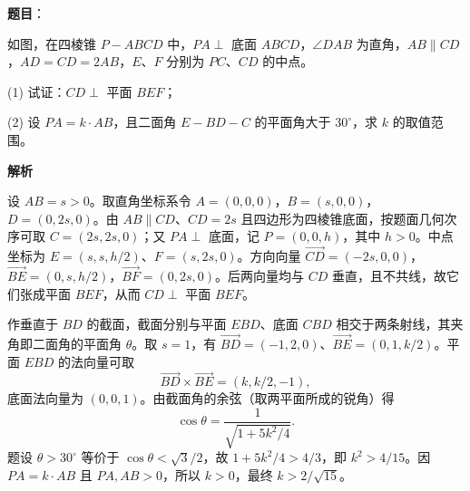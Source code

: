 \begin{answer}

\textbf{题目}：

如图，在四棱锥 \(P-ABCD\) 中，\(PA\perp\) 底面 \(ABCD\)，\(\angle DAB\) 为直角，\(AB\parallel CD\)，\(AD=CD=2AB\)，$E\text{、}F$ 分别为 $PC\text{、}CD$ 的中点。
\nopagebreak[4]
\begin{center}\end{center}
\nopagebreak[4]
(1) 试证：\(CD\perp\) 平面 \(BEF\)；

(2) 设 \(PA=k\cdot AB\)，且二面角 \(E-BD-C\) 的平面角大于 \(30^\circ\)，求 \(k\) 的取值范围。

\textbf{解析}


设 \(AB=s>0\)。取直角坐标系令 \(A=(0,0,0)\)，\(B=(s,0,0)\)，\(D=(0,2s,0)\)。由 \(AB\parallel CD\)、\(CD=2s\) 且四边形为四棱锥底面，按题面几何次序可取 \(C=(2s,2s,0)\)；又 \(PA\perp\) 底面，记 \(P=(0,0,h)\)，其中 \(h>0\)。中点坐标为 \(E=(s,s,h/2)\)、\(F=(s,2s,0)\)。方向向量 \(\overrightarrow{CD}=(-2s,0,0)\)，\(\overrightarrow{BE}=(0,s,h/2)\)，\(\overrightarrow{BF}=(0,2s,0)\)。后两向量均与 \(CD\) 垂直，且不共线，故它们张成平面 \(BEF\)，从而 \(CD\perp\) 平面 \(BEF\)。


作垂直于 \(BD\) 的截面，截面分别与平面 \(EBD\)、底面 \(CBD\) 相交于两条射线，其夹角即二面角的平面角 \(\theta\)。取 \(s=1\)，有 \(\overrightarrow{BD}=(-1,2,0)\)、\(\overrightarrow{BE}=(0,1,k/2)\)。平面 \(EBD\) 的法向量可取
\nopagebreak[4]
\[
\overrightarrow{BD}\times\overrightarrow{BE}=(k,k/2,-1),
\]
底面法向量为 \((0,0,1)\)。由截面角的余弦（取两平面所成的锐角）得
\nopagebreak[4]
\[
\cos\theta=\frac1{\sqrt{1+5k^2/4}}.
\]
题设 \(\theta>30^\circ\) 等价于 \(\cos\theta<\sqrt3/2\)，故 \(1+5k^2/4>4/3\)，即 \(k^2>4/15\)。因 \(PA=k\cdot AB\) 且 \(PA,AB>0\)，所以 \(k>0\)，最终 \(k>2/\sqrt{15}\)。



\end{answer}
